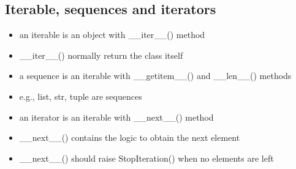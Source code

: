 \documentclass[11pt]{article}
\providecommand{\tightlist}{%
      \setlength{\itemsep}{0pt}\setlength{\parskip}{0pt}}
\begin{document}
    \hypertarget{iterable-sequences-and-iterators}{%
\subsection{Iterable, sequences and
iterators}\label{iterable-sequences-and-iterators}}

\begin{itemize}
\tightlist
\item
  an iterable is an object with \_\_iter\_\_() method
\item
  \_\_iter\_\_() normally return the class itself
\item
  a sequence is an iterable with \_\_getitem\_\_() and \_\_len\_\_()
  methods
\item
  e.g., list, str, tuple are sequences
\item
  an iterator is an iterable with \_\_next\_\_() method
\item
  \_\_next\_\_() contains the logic to obtain the next element
\item
  \_\_next\_\_() should raise StopIteration() when no elements are left
\end{itemize}
\end{document}
